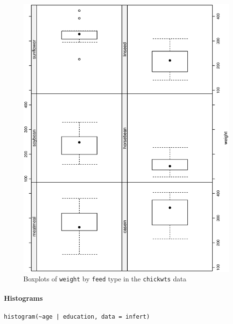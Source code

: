 \documentclass[captions=tableheading]{scrbook}
\begin{document}
\begin{figure}[th]
  \includegraphics[angle=270, totalheight=4in]{ps/bwplot.ps}
  \caption{Boxplots of \texttt{weight} by \texttt{feed} type in the \texttt{chickwts} data}
  \label{fig:bwplot}
\end{figure}

\paragraph*{Histograms}


\begin{verbatim}
histogram(~age | education, data = infert)
\end{verbatim}
\end{document}
